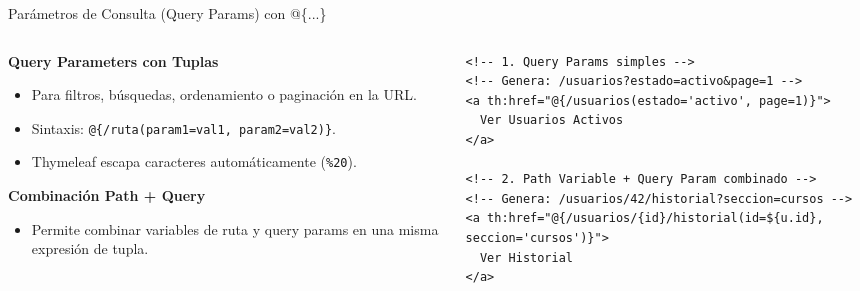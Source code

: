 \documentclass[aspectratio=169]{beamer}
\begin{document}
\begin{frame}[fragile]{Par\'ametros de Consulta (Query Params) con @\{...\}}
\begin{columns}[c]
\begin{column}{0.48\textwidth}
  \textbf{Query Parameters con Tuplas}
  \begin{itemize}
    \item Para filtros, b\'usquedas, ordenamiento o paginaci\'on en la URL.
    \item Sintaxis: \texttt{@\{/ruta(param1=val1, param2=val2)\}}.
    \item Thymeleaf escapa caracteres autom\'aticamente (\texttt{\%20}).
  \end{itemize}
  \vspace{3pt}
  \textbf{Combinaci\'on Path + Query}
  \begin{itemize}
    \item Permite combinar variables de ruta y query params en una misma expresi\'on de tupla.
  \end{itemize}
\end{column}
\begin{column}{0.50\textwidth}
\begin{lstlisting}[style=ThymeleafStyle]
<!-- 1. Query Params simples -->
<!-- Genera: /usuarios?estado=activo&page=1 -->
<a th:href="@{/usuarios(estado='activo', page=1)}">
  Ver Usuarios Activos
</a>

<!-- 2. Path Variable + Query Param combinado -->
<!-- Genera: /usuarios/42/historial?seccion=cursos -->
<a th:href="@{/usuarios/{id}/historial(id=${u.id}, seccion='cursos')}">
  Ver Historial
</a>
\end{lstlisting}
\end{column}
\end{columns}
\end{frame}
\end{document}
